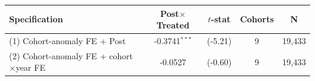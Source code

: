 \begin{tabular}{lcccc}
\toprule
Specification & Post$\times$Treated & $t$-stat & Cohorts & N \\
\midrule
(1) Cohort-anomaly FE + Post & -0.3741$^{***}$ & (-5.21) & 9 & 19,433 \\
(2) Cohort-anomaly FE + cohort$\times$year FE & -0.0527 & (-0.60) & 9 & 19,433 \\
\bottomrule
\end{tabular}